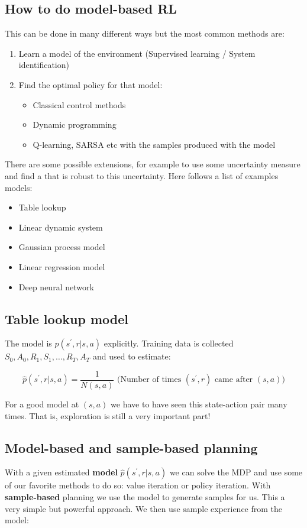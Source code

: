 \subsection{How to do model-based RL}
This can be done in many different ways but the most common methods are: 

\begin{enumerate}
	\item Learn a model of the environment (Supervised learning / System identification)
	\item Find the optimal policy for that model:
		\begin{itemize}
			\item Classical control  methods
			\item Dynamic programming 
			\item Q-learning, SARSA etc with the samples produced with the model
		\end{itemize}
\end{enumerate}

There are some possible extensions, for example to use some uncertainty measure and find a that is robust to this uncertainty. Here follows a list of examples models:

\begin{itemize}
	\item Table lookup
	\item Linear dynamic system 
	\item Gaussian process model
	\item Linear regression model
	\item Deep neural network
\end{itemize}


\subsection{Table lookup model}
The model is $p(s^{\prime},r|s,a)$ explicitly. Training data is collected $S_0, A_0, R_1, S_1, \ldots, R_T,A_T$ and used to estimate:

	\begin{equation}
		\hat{p} (s^{\prime},r|s,a) = \frac{1} {N(s,a)} \text{ (Number of times } (s^{\prime},r) \text{ came after } (s,a)) 
	\end{equation}

For a good model at $(s,a)$ we have to have seen this state-action pair many times. That is, exploration is still a very important part!

\subsection{Model-based and sample-based planning}
With a given estimated \textbf{model} $\hat{p}(s^{\prime},r|s,a)$ we can solve the MDP and use some of our favorite methods to do so: value iteration or policy iteration. With \textbf{sample-based} planning we use the model to generate samples for us. This a very simple but powerful approach. We then use sample experience from the model:

